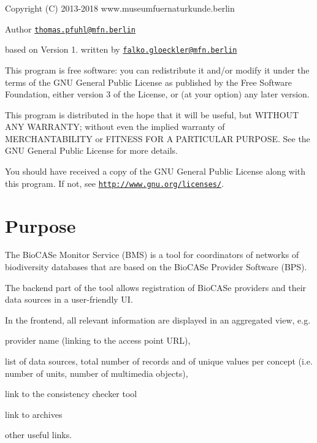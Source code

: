 \begin{DoxyCopyright}{Copyright}
(C) 2013-\/2018 www.\+museumfuernaturkunde.\+berlin
\end{DoxyCopyright}
\begin{DoxyAuthor}{Author}
\href{mailto:thomas.pfuhl@mfn.berlin}{\tt thomas.\+pfuhl@mfn.\+berlin}
\end{DoxyAuthor}
based on Version 1. written by \href{mailto:falko.gloeckler@mfn.berlin}{\tt falko.\+gloeckler@mfn.\+berlin}

This program is free software\+: you can redistribute it and/or modify it under the terms of the G\+NU General Public License as published by the Free Software Foundation, either version 3 of the License, or (at your option) any later version.

This program is distributed in the hope that it will be useful, but W\+I\+T\+H\+O\+UT A\+NY W\+A\+R\+R\+A\+N\+TY; without even the implied warranty of M\+E\+R\+C\+H\+A\+N\+T\+A\+B\+I\+L\+I\+TY or F\+I\+T\+N\+E\+SS F\+OR A P\+A\+R\+T\+I\+C\+U\+L\+AR P\+U\+R\+P\+O\+SE. See the G\+NU General Public License for more details.

You should have received a copy of the G\+NU General Public License along with this program. If not, see \href{http://www.gnu.org/licenses/}{\tt http\+://www.\+gnu.\+org/licenses/}.





\section*{Purpose}

The Bio\+C\+A\+Se Monitor Service (B\+MS) is a tool for coordinators of networks of biodiversity databases that are based on the Bio\+C\+A\+Se Provider Software (B\+PS).

The backend part of the tool allows registration of Bio\+C\+A\+Se providers and their data sources in a user-\/friendly UI.

In the frontend, all relevant information are displayed in an aggregated view, e.\+g.
\begin{DoxyItemize}
\item provider name (linking to the access point U\+RL),
\item list of data sources, total number of records and of unique values per concept (i.\+e. number of units, number of multimedia objects),
\item link to the consistency checker tool
\item link to archives
\item other useful links.
\end{DoxyItemize}

